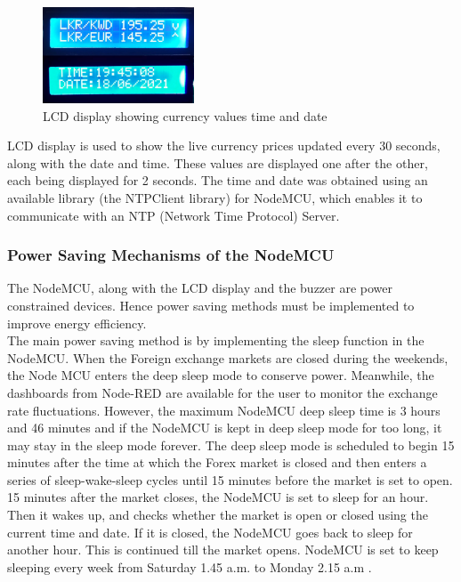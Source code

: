 \begin{figure}[H]
    \centering
      \includegraphics[width=0.4\textwidth]{images/lcd.png}
    \caption{LCD display showing currency values time and date}
    \label{abcd}
\end{figure}


LCD display is used to show the live currency prices updated every 30 seconds, along with the date and time. These values are displayed one after the other, each being displayed for 2 seconds. The time and date was obtained using an available library (the NTPClient library) for NodeMCU, which enables it to communicate with an NTP (Network Time Protocol) Server.\\

\subsubsection{Power Saving Mechanisms of the NodeMCU}

The NodeMCU, along with the LCD display and the buzzer are power constrained devices. Hence power saving methods must be implemented to improve energy efficiency.\\

The main power saving method is by implementing the sleep function in the NodeMCU. When the Foreign exchange markets are closed during the weekends, the Node MCU enters the deep sleep mode to conserve power. Meanwhile, the dashboards from Node-RED are available for the user to monitor the exchange rate fluctuations. However, the maximum NodeMCU deep sleep time is 3 hours and 46 minutes \cite{deepsleep} and if the NodeMCU is kept in deep sleep mode for too long, it may stay in the sleep mode forever. The deep sleep mode is scheduled to begin 15 minutes after the time at which the Forex market is closed and then enters a series of sleep-wake-sleep cycles until 15 minutes before the market is set to open.\\

15 minutes after the market closes, the NodeMCU is set to sleep for an hour. Then it wakes up, and checks whether the market is open or closed using the current time and date. If it is closed, the NodeMCU goes back to sleep for another hour. This is continued till the market opens. NodeMCU is set to keep sleeping every week from Saturday 1.45 a.m. to Monday 2.15 a.m \cite{hours}.\\

